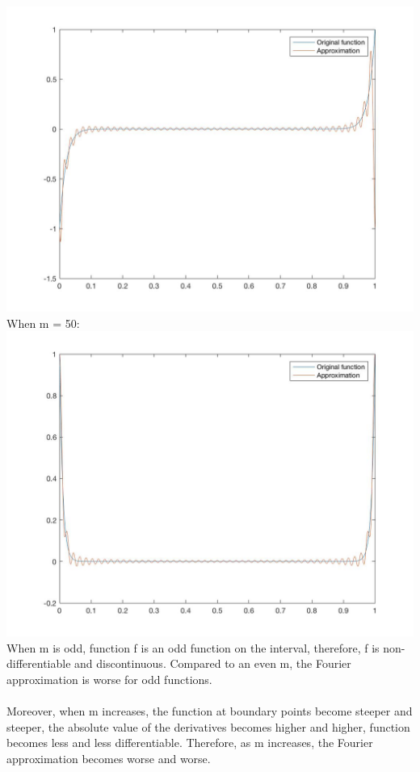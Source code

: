\documentclass[11pt]{article} %
\begin{document}
\includegraphics[scale=0.3]{e243.jpg}\\
When m = 50:\\
\includegraphics[scale=0.3]{e244.jpg}\\
When m is odd, function f is an odd function on the interval, therefore, f is non-differentiable and discontinuous. Compared to an even m, the Fourier approximation is worse for odd functions.\\\\
Moreover, when m increases, the function at boundary points become steeper and steeper, the absolute value of the derivatives becomes higher and higher, function becomes less and less differentiable. Therefore, as m increases, the Fourier approximation becomes worse and worse.
\end{document}
